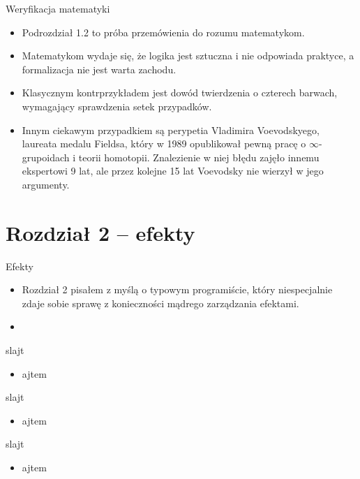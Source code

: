 \documentclass{beamer}
\begin{document}
\begin{frame}{Weryfikacja matematyki}
\begin{itemize}
	\item Podrozdział 1.2 to próba przemówienia do rozumu matematykom.
	\item Matematykom wydaje się, że logika jest sztuczna i nie odpowiada praktyce, a formalizacja nie jest warta zachodu.
	\item Klasycznym kontrprzykładem jest dowód twierdzenia o czterech barwach, wymagający sprawdzenia setek przypadków.
	\item Innym ciekawym przypadkiem są perypetia Vladimira Voevodskyego, laureata medalu Fieldsa, który w 1989 opublikował pewną pracę o $\infty$-grupoidach i teorii homotopii. Znalezienie w niej błędu zajęło innemu ekspertowi 9 lat, ale przez kolejne 15 lat Voevodsky nie wierzył w jego argumenty.
\end{itemize}
\end{frame}

\section{Rozdział 2 -- efekty}

\begin{frame}{Efekty}
\begin{itemize}
	\item Rozdział 2 pisałem z myślą o typowym programiście, który niespecjalnie zdaje sobie sprawę z konieczności mądrego zarządzania efektami.
	\item 
\end{itemize}
\end{frame}

\begin{frame}{slajt}
\begin{itemize}
	\item ajtem
\end{itemize}
\end{frame}

\begin{frame}{slajt}
\begin{itemize}
	\item ajtem
\end{itemize}
\end{frame}

\begin{frame}{slajt}
\begin{itemize}
	\item ajtem
\end{itemize}
\end{frame}
\end{document}
